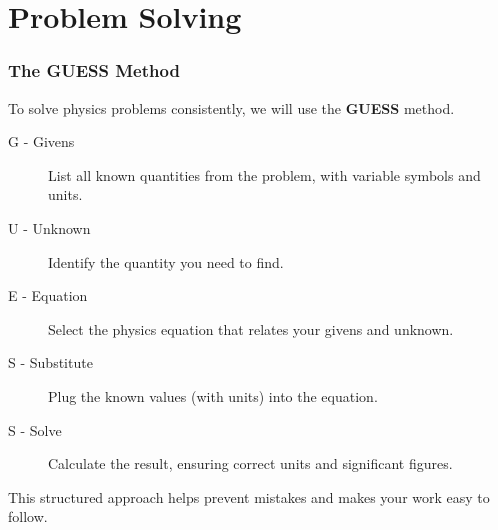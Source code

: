 \documentclass{beamer}
\begin{document}
\section{Problem Solving}

\begin{frame}
\frametitle{The GUESS Method}
To solve physics problems consistently, we will use the \textbf{GUESS} method.
\begin{description}
    \item[\alert{G} - Givens] List all known quantities from the problem, with variable symbols and units.
    \item[\alert{U} - Unknown] Identify the quantity you need to find.
    \item[\alert{E} - Equation] Select the physics equation that relates your givens and unknown.
    \item[\alert{S} - Substitute] Plug the known values (with units) into the equation.
    \item[\alert{S} - Solve] Calculate the result, ensuring correct units and significant figures.
\end{description}
This structured approach helps prevent mistakes and makes your work easy to follow.
\end{frame}
\end{document}
